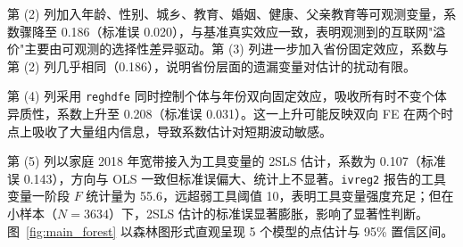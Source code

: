 \documentclass[a4paper,11pt]{article}
\begin{document}
第 (2) 列加入年龄、性别、城乡、教育、婚姻、健康、父亲教育等可观测变量，系数骤降至 0.186（标准误 0.020），与基准真实效应一致，表明观测到的互联网"溢价"主要由可观测的选择性差异驱动。第 (3) 列进一步加入省份固定效应，系数与第 (2) 列几乎相同（0.186），说明省份层面的遗漏变量对估计的扰动有限。

第 (4) 列采用 \texttt{reghdfe} 同时控制个体与年份双向固定效应，吸收所有时不变个体异质性，系数上升至 0.208（标准误 0.031）。这一上升可能反映双向 FE 在两个时点上吸收了大量组内信息，导致系数估计对短期波动敏感。

第 (5) 列以家庭 2018 年宽带接入为工具变量的 2SLS 估计，系数为 0.107（标准误 0.143），方向与 OLS 一致但标准误偏大、统计上不显著。\texttt{ivreg2} 报告的工具变量一阶段 $F$ 统计量为 55.6，远超弱工具阈值 10，表明工具变量强度充足；但在小样本（$N=3634$）下，2SLS 估计的标准误显著膨胀，影响了显著性判断。图~\ref{fig:main_forest} 以森林图形式直观呈现 5 个模型的点估计与 95\% 置信区间。
\end{document}

